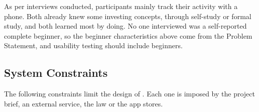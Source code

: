 \documentclass[12pt]{article}
\begin{document}
As per interviews conducted, participants mainly track their activity with a phone. Both
already knew some investing concepts, through self-study or formal study, and
both learned most by doing.
No one interviewed was a self-reported complete beginner, so the beginner characteristics above come
from the Problem Statement, and usability testing should include beginners.

\subsection{System Constraints}


The following constraints limit the design of \progname{}. Each one is imposed
by the project brief, an external service, the law or the app stores.
\end{document}
